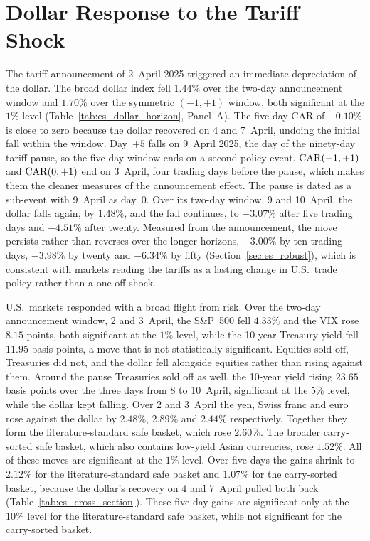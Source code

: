 \section{Dollar Response to the Tariff Shock}
\label{sec:es_tariff}

The tariff announcement of 2~April 2025 triggered an immediate depreciation of the dollar. The broad dollar index fell $1.44\%$ over the two-day announcement window and $1.70\%$ over the symmetric $(-1,+1)$ window, both significant at the $1\%$ level (Table~\ref{tab:es_dollar_horizon}, Panel~A). The five-day CAR of $-0.10\%$ is close to zero because the dollar recovered on 4 and 7~April, undoing the initial fall within the window. Day~$+5$ falls on 9~April 2025, the day of the ninety-day tariff pause, so the five-day window ends on a second policy event. $\mathrm{CAR}(-1,+1)$ and $\mathrm{CAR}(0,+1)$ end on 3~April, four trading days before the pause, which makes them the cleaner measures of the announcement effect. The pause is dated as a sub-event with 9~April as day~0. Over its two-day window, 9 and 10~April, the dollar falls again, by $1.48\%$, and the fall continues, to $-3.07\%$ after five trading days and $-4.51\%$ after twenty. Measured from the announcement, the move persists rather than reverses over the longer horizons, $-3.00\%$ by ten trading days, $-3.98\%$ by twenty and $-6.34\%$ by fifty (Section~\ref{sec:es_robust}), which is consistent with markets reading the tariffs as a lasting change in U.S.\ trade policy rather than a one-off shock.

U.S.\ markets responded with a broad flight from risk. Over the two-day announcement window, 2 and 3~April, the S\&P~500 fell $4.33\%$ and the VIX rose $8.15$ points, both significant at the $1\%$ level, while the 10-year Treasury yield fell $11.95$ basis points, a move that is not statistically significant. Equities sold off, Treasuries did not, and the dollar fell alongside equities rather than rising against them.
Around the pause Treasuries sold off as well, the 10-year yield rising $23.65$ basis points over the three days from 8 to 10~April, significant at the $5\%$ level, while the dollar kept falling. Over 2 and 3~April the yen, Swiss franc and euro rose against the dollar by $2.48\%$, $2.89\%$ and $2.44\%$ respectively. Together they form the literature-standard safe basket, which rose $2.60\%$. The broader carry-sorted safe basket, which also contains low-yield Asian currencies, rose $1.52\%$. All of these moves are significant at the $1\%$ level. Over five days the gains shrink to $2.12\%$ for the literature-standard safe basket and $1.07\%$ for the carry-sorted basket, because the dollar's recovery on 4 and 7~April pulled both back (Table~\ref{tab:es_cross_section}). These five-day gains are significant only at the $10\%$ level for the literature-standard safe basket, while not significant for the carry-sorted basket.

